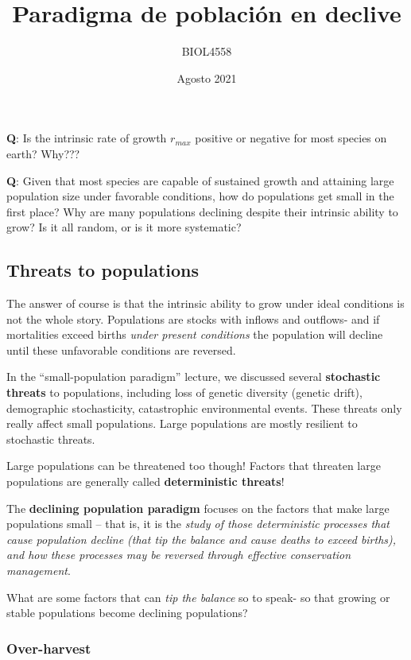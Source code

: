 \documentclass[
]{article}
\title{Paradigma de población en declive}
\author{BIOL4558}
\date{Agosto 2021}
\begin{document}
\maketitle

{
\setcounter{tocdepth}{2}
\tableofcontents
}
\textbf{Q}: Is the intrinsic rate of growth \(r_{max}\) positive or
negative for most species on earth? Why???

\textbf{Q}: Given that most species are capable of sustained growth and
attaining large population size under favorable conditions, how do
populations get small in the first place? Why are many populations
declining despite their intrinsic ability to grow? Is it all random, or
is it more systematic?

\hypertarget{threats-to-populations}{%
\subsection{Threats to populations}\label{threats-to-populations}}

The answer of course is that the intrinsic ability to grow under ideal
conditions is not the whole story. Populations are stocks with inflows
and outflows- and if mortalities exceed births \emph{under present
conditions} the population will decline until these unfavorable
conditions are reversed.

In the ``small-population paradigm'' lecture, we discussed several
\textbf{stochastic threats} to populations, including loss of genetic
diversity (genetic drift), demographic stochasticity, catastrophic
environmental events. These threats only really affect small
populations. Large populations are mostly resilient to stochastic
threats.

Large populations can be threatened too though! Factors that threaten
large populations are generally called \textbf{deterministic threats}!

The \textbf{declining population paradigm} focuses on the factors that
make large populations small -- that is, it is the \emph{study of those
deterministic processes that cause population decline (that tip the
balance and cause deaths to exceed births), and how these processes may
be reversed through effective conservation management}.

What are some factors that can \emph{tip the balance} so to speak- so
that growing or stable populations become declining populations?

\hypertarget{over-harvest}{%
\subsubsection{Over-harvest}\label{over-harvest}}
\end{document}
